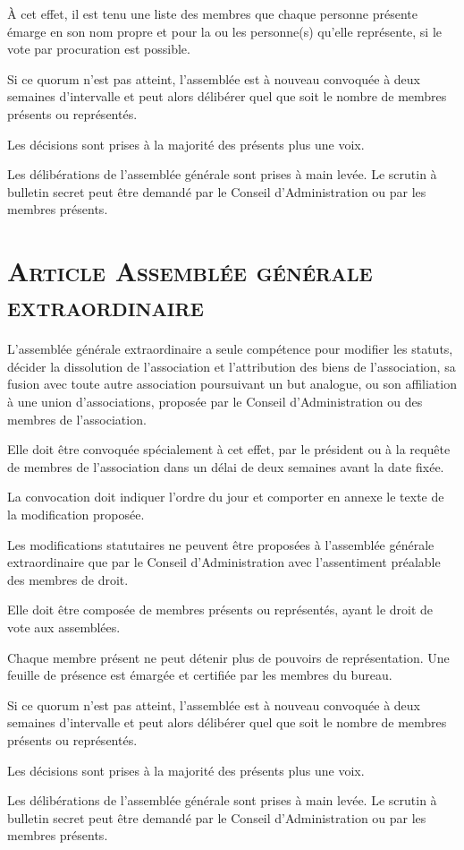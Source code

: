 \documentclass[a4paper,11pt]{article}
\newcounter{ArticleCounter}
\newcommand{\article}[1]{\section*{\textsc{Article 
			\ifnumcomp{\value{ArticleCounter}}{=}{1}{premier}{\arabic{ArticleCounter}} \textendash
			\stepcounter{ArticleCounter}
			#1}}}
\begin{document}
À cet effet, il est tenu une liste des membres que chaque personne présente émarge en son nom propre et pour la ou les personne(s) qu'elle représente, si le vote par procuration est possible.\bigskip

Si ce quorum n'est pas atteint, l'assemblée est à nouveau convoquée à deux semaines d'intervalle et peut alors délibérer quel que soit le nombre de membres présents ou représentés.\bigskip

Les décisions sont prises à la majorité des présents plus une voix.\bigskip

Les délibérations de l'assemblée générale sont prises à main levée. Le scrutin à bulletin secret peut être demandé par le Conseil d'Administration ou par les membres présents.

\article{Assemblée générale extraordinaire}

L'assemblée générale extraordinaire a seule compétence pour modifier les statuts, décider la dissolution de l'association et l'attribution des biens de l'association, sa fusion avec toute autre association poursuivant un but analogue, ou son affiliation à une union d'associations, proposée par le Conseil d'Administration ou des membres de l'association.\bigskip

Elle doit être convoquée spécialement à cet effet, par le président ou à la requête de membres de l'association dans un délai de deux semaines avant la date fixée.\bigskip

La convocation doit indiquer l'ordre du jour et comporter en annexe le texte de la modification proposée.\bigskip

Les modifications statutaires ne peuvent être proposées à l'assemblée générale extraordinaire que par le Conseil d'Administration avec l'assentiment préalable des membres de droit.\bigskip

Elle doit être composée de membres présents ou représentés, ayant le droit de vote aux assemblées.\bigskip

Chaque membre présent ne peut détenir plus de pouvoirs de représentation. Une feuille de présence est émargée et certifiée par les membres du bureau.\bigskip

Si ce quorum n'est pas atteint, l'assemblée est à nouveau convoquée à deux semaines d'intervalle et peut alors délibérer quel que soit le nombre de membres présents ou représentés.\bigskip

Les décisions sont prises à la majorité des présents plus une voix.\bigskip

Les délibérations de l'assemblée générale sont prises à main levée. Le scrutin à bulletin secret peut être demandé par le Conseil d'Administration ou par les membres présents.
\end{document}
